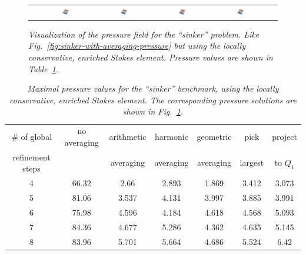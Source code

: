 \documentclass{article}
\begin{document}
\begin{figure}[htb]
\begin{tabular}{cccccc}
    &
    \includegraphics[width=0.14\textwidth]{cookbooks/sinker-with-averaging/q2q1plus/sinker-8-harmonic.png}
    &
    \includegraphics[width=0.14\textwidth]{cookbooks/sinker-with-averaging/q2q1plus/sinker-8-geometric.png}
    &
    \includegraphics[width=0.14\textwidth]{cookbooks/sinker-with-averaging/q2q1plus/sinker-8-pick-largest.png}
    &
    \includegraphics[width=0.14\textwidth]{cookbooks/sinker-with-averaging/q2q1plus/sinker-8-project-to-Q1.png}
  \end{tabular}
  \caption{\it Visualization of the pressure field for the ``sinker''
    problem. Like Fig.~\ref{fig:sinker-with-averaging-pressure} but using the
    locally conservative, enriched Stokes element. Pressure values are shown
    in Table~\ref{tab:sinker-with-averaging-max-pressure-q2q1iso}.}
  \label{fig:sinker-with-averaging-pressure-q2q1iso}
\end{figure}


\begin{table}[htb]
  \center
  \begin{tabular}{|c|cccccc|}
    \hline
    \# of global & no averaging & arithmetic & harmonic & geometric
    & pick & project \\
    refinement steps & & averaging & averaging &
    averaging & largest & to $Q_1$
    \\ \hline
    4 & 66.32 & 2.66 & 2.893 & 1.869 & 3.412 & 3.073 \\
    5 & 81.06 & 3.537 & 4.131 & 3.997 & 3.885 & 3.991 \\
    6 & 75.98 & 4.596 & 4.184 & 4.618 & 4.568 & 5.093 \\
    7 & 84.36 & 4.677 & 5.286 & 4.362 & 4.635 & 5.145 \\
    8 & 83.96 & 5.701 & 5.664 & 4.686 & 5.524 & 6.42 \\ \hline
  \end{tabular}
  \caption{\it Maximal pressure values for the ``sinker'' benchmark, using the
  locally conservative, enriched Stokes element. The corresponding
  pressure solutions are shown in
  Fig.~\ref{fig:sinker-with-averaging-pressure-q2q1iso}.}
  \label{tab:sinker-with-averaging-max-pressure-q2q1iso}
\end{table}
\end{document}

